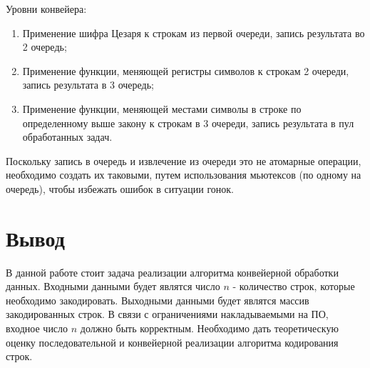 Уровни конвейера:
\begin{enumerate}
    \item Применение шифра Цезаря к строкам из первой очереди, запись результата во 2 очередь;
    \item Применение функции, меняющей регистры символов к строкам 2 очереди, запись результата в 3 очередь;
    \item Применение функции, меняющей местами символы в строке по определенному выше закону к строкам в 3 очереди, запись результата в пул обработанных задач.
\end{enumerate}
Поскольку запись в очередь и извлечение из очереди это не атомарные операции, необходимо создать их таковыми, путем использования мьютексов (по одному на очередь), чтобы избежать ошибок в ситуации гонок.

\section*{Вывод} 
В данной работе стоит задача реализации алгоритма конвейерной обработки данных. Входными данными будет являтся число $n$ - количество строк, которые необходимо закодировать. Выходными данными будет являтся массив закодированных строк. В связи с ограничениями накладываемыми на ПО, входное число $n$ должно быть корректным. Необходимо дать теоретическую оценку последовательной и конвейерной реализации алгоритма кодирования строк. 
